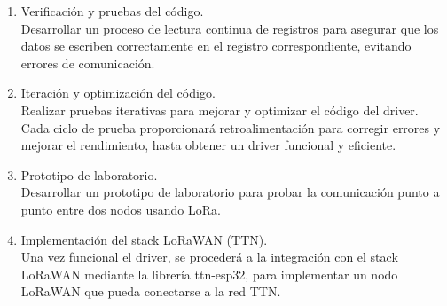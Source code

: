 \begin{enumerate}
    \item Verificación y pruebas del código. \\
    Desarrollar un proceso de lectura continua de registros para asegurar que los datos se escriben correctamente en el registro correspondiente, evitando errores de comunicación.
    \item Iteración y optimización del código. \\
    Realizar pruebas iterativas para mejorar y optimizar el código del driver. Cada ciclo de prueba proporcionará retroalimentación para corregir errores y mejorar el rendimiento, hasta obtener un driver funcional y eficiente.
    \item Prototipo de laboratorio. \\
    Desarrollar un prototipo de laboratorio para probar la comunicación punto a punto entre dos nodos usando LoRa.
    \item Implementación del stack LoRaWAN (TTN). \\
    Una vez funcional el driver, se procederá a la integración con el stack LoRaWAN mediante la librería ttn-esp32, para implementar un nodo LoRaWAN que pueda conectarse a la red TTN.
\end{enumerate}

